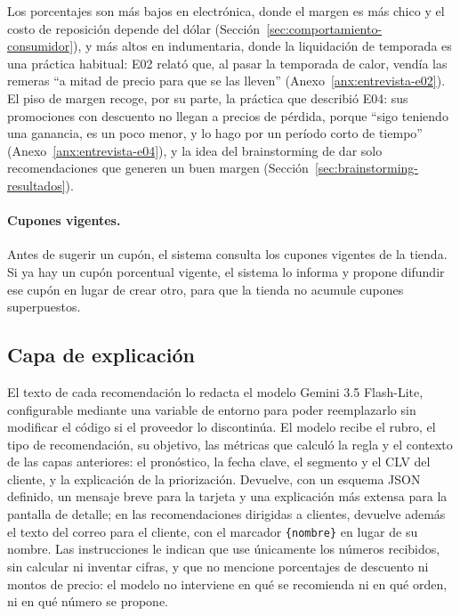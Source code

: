 Los porcentajes son más bajos en electrónica, donde el margen es más chico y el costo de reposición depende del dólar (Sección~\ref{sec:comportamiento-consumidor}), y más altos en indumentaria, donde la liquidación de temporada es una práctica habitual: E02 relató que, al pasar la temporada de calor, vendía las remeras \enquote{a mitad de precio para que se las lleven} (Anexo~\ref{anx:entrevista-e02}). El piso de margen recoge, por su parte, la práctica que describió E04: sus promociones con descuento no llegan a precios de pérdida, porque \enquote{sigo teniendo una ganancia, es un poco menor, y lo hago por un período corto de tiempo} (Anexo~\ref{anx:entrevista-e04}), y la idea del brainstorming de dar solo recomendaciones que generen un buen margen (Sección~\ref{sec:brainstorming-resultados}).

\paragraph{Cupones vigentes.} Antes de sugerir un cupón, el sistema consulta los cupones vigentes de la tienda. Si ya hay un cupón porcentual vigente, el sistema lo informa y propone difundir ese cupón en lugar de crear otro, para que la tienda no acumule cupones superpuestos.

\subsection{Capa de explicación}
\label{sec:motor-explicacion}

El texto de cada recomendación lo redacta el modelo Gemini 3.5 Flash-Lite, configurable mediante una variable de entorno para poder reemplazarlo sin modificar el código si el proveedor lo discontinúa. El modelo recibe el rubro, el tipo de recomendación, su objetivo, las métricas que calculó la regla y el contexto de las capas anteriores: el pronóstico, la fecha clave, el segmento y el CLV del cliente, y la explicación de la priorización. Devuelve, con un esquema JSON definido, un mensaje breve para la tarjeta y una explicación más extensa para la pantalla de detalle; en las recomendaciones dirigidas a clientes, devuelve además el texto del correo para el cliente, con el marcador \texttt{\{nombre\}} en lugar de su nombre. Las instrucciones le indican que use únicamente los números recibidos, sin calcular ni inventar cifras, y que no mencione porcentajes de descuento ni montos de precio: el modelo no interviene en qué se recomienda ni en qué orden, ni en qué número se propone.

